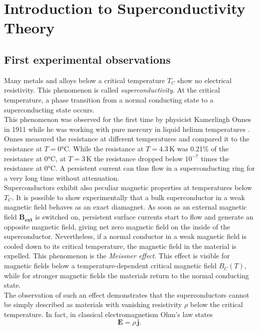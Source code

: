 \documentclass[../main/main.tex]{subfiles}
\begin{document}
\chapter{Introduction to Superconductivity Theory}

\section{First experimental observations}
Many metals and alloys below a critical temperature $T_C$ show no electrical resistivity. This phenomenon is called \textit{superconductivity}. At the critical temperature, a phase transition from a normal conducting state to a superconducting state occurs.\\
This phenomenon was observed for the first time by physicist Kamerlingh Onnes in 1911 while he was working with pure mercury in liquid helium temperatures \cite{Onnes1991}. Onnes measured the resistance at different temperatures and compared it to the resistance at $T=0$°C. While the resistance at $T=4.3\,$K was 0.21\% of the resistance at $0$°C, at $T=3\,$K the resistance dropped below $10^{-7}$ times the resistance at 0°C. A persistent current can thus flow in a superconducting ring for a very long time without attenuation.\\
Superconductors exhibit also peculiar magnetic properties at temperatures below $T_C$. It is possible to show experimentally that a bulk superconductor in a weak magnetic field behaves as an exact diamagnet. As soon as an external magnetic field $ \boldsymbol{B_{ext}}$ is switched on, persistent surface currents start to flow and generate an opposite magnetic field, giving net zero magnetic field on the inside of the superconductor. Nevertheless, if a normal conductor in a weak magnetic field is cooled down to its critical temperature, the magnetic field in the material is expelled. This phenomenon is the \textit{Meissner effect}. This effect is visible for magnetic fields below a temperature-dependent critical magnetic field $B_C (T)$, while for stronger magnetic fields the materials return to the normal conducting state.\\
The observation of such an effect demonstrates that the superconductors cannot be simply described as materials with vanishing resistivity $\rho$ below the critical temperature. In fact, in classical electromagnetism Ohm's law states
\begin{equation} \label{eq:Ohm_law}
    \boldsymbol{E} = \rho\, \boldsymbol{j}.
\end{equation}
\end{document}

